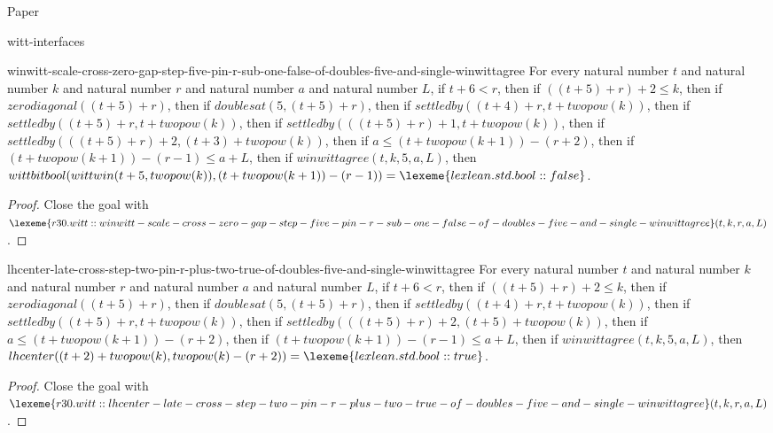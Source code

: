 \begin{lexlean}{Paper}
\begin{section}{witt-interfaces}
  \begin{theorem}{winwitt-scale-cross-zero-gap-step-five-pin-r-sub-one-false-of-doubles-five-and-single-winwittagree}
  For every natural number \(t\) and natural number \(k\) and natural number \(r\) and natural number \(a\) and natural number \(L\), if \(t + 6 < r\), then if \(((t + 5) + r) + 2 ≤ k\), then if \(zerodiagonal((t + 5) + r)\), then if \(doublesat(5, (t + 5) + r)\), then if \(settledby((t + 4) + r, t + twopow(k))\), then if \(settledby((t + 5) + r, t + twopow(k))\), then if \(settledby(((t + 5) + r) + 1, t + twopow(k))\), then if \(settledby(((t + 5) + r) + 2, (t + 3) + twopow(k))\), then if \(a ≤ (t + twopow(k + 1)) - (r + 2)\), then if \((t + twopow(k + 1)) - (r - 1) ≤ a + L\), then if \(winwittagree(t, k, 5, a, L)\), then \(wittbitbool(wittwin(t + 5, twopow(k)), (t + twopow(k + 1)) - (r - 1)) = \lexeme{lexlean.std.bool::false}\).
  \begin{proof}
  Close the goal with \(\lexeme{r30.witt::winwitt-scale-cross-zero-gap-step-five-pin-r-sub-one-false-of-doubles-five-and-single-winwittagree}(t, k, r, a, L)\).
  \end{proof}
  \end{theorem}

  \begin{theorem}{lhcenter-late-cross-step-two-pin-r-plus-two-true-of-doubles-five-and-single-winwittagree}
  For every natural number \(t\) and natural number \(k\) and natural number \(r\) and natural number \(a\) and natural number \(L\), if \(t + 6 < r\), then if \(((t + 5) + r) + 2 ≤ k\), then if \(zerodiagonal((t + 5) + r)\), then if \(doublesat(5, (t + 5) + r)\), then if \(settledby((t + 4) + r, t + twopow(k))\), then if \(settledby((t + 5) + r, t + twopow(k))\), then if \(settledby(((t + 5) + r) + 2, (t + 5) + twopow(k))\), then if \(a ≤ (t + twopow(k + 1)) - (r + 2)\), then if \((t + twopow(k + 1)) - (r - 1) ≤ a + L\), then if \(winwittagree(t, k, 5, a, L)\), then \(lhcenter((t + 2) + twopow(k), twopow(k) - (r + 2)) = \lexeme{lexlean.std.bool::true}\).
  \begin{proof}
  Close the goal with \(\lexeme{r30.witt::lhcenter-late-cross-step-two-pin-r-plus-two-true-of-doubles-five-and-single-winwittagree}(t, k, r, a, L)\).
  \end{proof}
  \end{theorem}


\end{section}
\end{lexlean}
